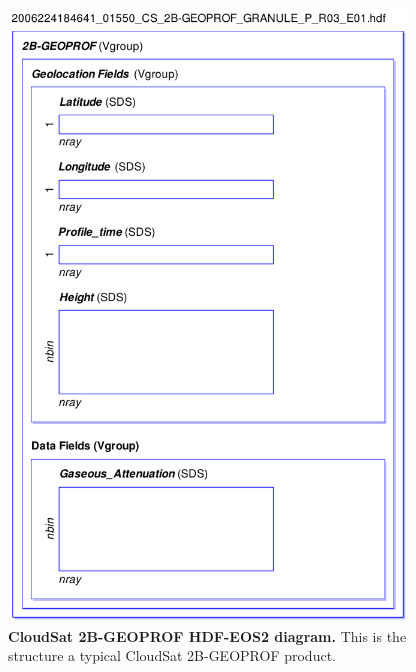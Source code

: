 \begin{figure}[p]
\includegraphics[width=300pt]{images/hdf-eos2_2b-geoprof.pdf}
\caption[CloudSat 2B-GEOPROF HDF-EOS2 diagram]{\textbf{CloudSat 2B-GEOPROF HDF-EOS2 diagram.}
This is the structure a typical CloudSat 2B-GEOPROF product.}
\label{fig:hdfeos2-2bgeoprof}
\end{figure}

